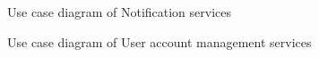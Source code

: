 \documentclass[12pt]{article}
\begin{document}
\begin{figure}[H]
\centering	
{}
\caption{Use case diagram of Notification services}
\end{figure}

\begin{figure}[H]
\centering	
{}
\caption{Use case diagram of User account management services}
\end{figure}
\end{document}
